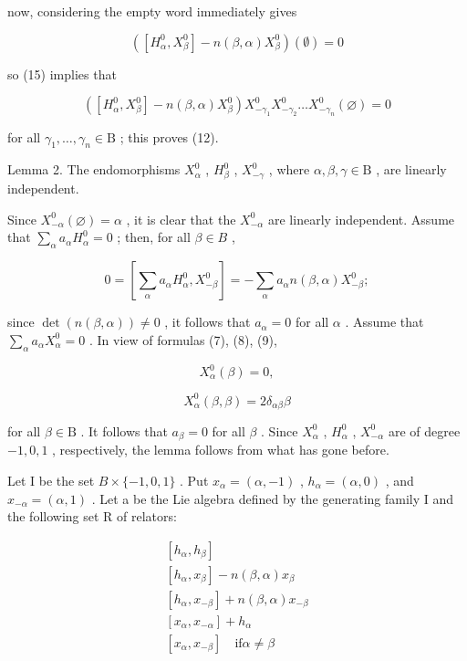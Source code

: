 now, considering the empty word immediately gives

\[
([ H _ {\alpha} ^ {0}, X _ {\beta} ^ {0} ] - n (\beta , \alpha) X _ {\beta} ^ {0}) (\emptyset) = 0
\]

so (15) implies that

\[
\left(\left[ H _ {\alpha} ^ {0}, X _ {\beta} ^ {0} \right] - n (\beta , \alpha) X _ {\beta} ^ {0}\right) X _ {- \gamma_ {1}} ^ {0} X _ {- \gamma_ {2}} ^ {0} \dots X _ {- \gamma_ {n}} ^ {0} (\varnothing) = 0
\]

for all \(\gamma_1, \ldots, \gamma_n \in \mathrm{B}\) ; this proves (12).

Lemma 2. The endomorphisms \(X_{\alpha}^{0}\) , \(H_{\beta}^{0}\) , \(X_{-\gamma}^{0}\) , where \(\alpha, \beta, \gamma \in \mathrm{B}\) , are linearly independent.

Since \(X_{-\alpha}^{0}(\varnothing) = \alpha\) , it is clear that the \(X_{-\alpha}^{0}\) are linearly independent. Assume that \(\sum_{\alpha} a_{\alpha} H_{\alpha}^{0} = 0\) ; then, for all \(\beta \in B\) ,

\[
0 = \left[ \sum_ {\alpha} a _ {\alpha} H _ {\alpha} ^ {0}, X _ {- \beta} ^ {0} \right] = - \sum_ {\alpha} a _ {\alpha} n (\beta , \alpha) X _ {- \beta} ^ {0};
\]

since \(\operatorname{det}(n(\beta, \alpha)) \neq 0\) , it follows that \(a_{\alpha} = 0\) for all \(\alpha\) . Assume that \(\sum_{\alpha} a_{\alpha} X_{\alpha}^{0} = 0\) . In view of formulas (7), (8), (9),

\[
X _ {\alpha} ^ {0} (\beta) = 0,
\]

\[
X _ {\alpha} ^ {0} (\beta , \beta) = 2 \delta_ {\alpha \beta} \beta
\]

for all \(\beta \in \mathrm{B}\) . It follows that \(a_{\beta} = 0\) for all \(\beta\) . Since \(X_{\alpha}^{0}\) , \(H_{\alpha}^{0}\) , \(X_{-\alpha}^{0}\) are of degree \(-1, 0, 1\) , respectively, the lemma follows from what has gone before.

Let I be the set \(B \times \{-1,0,1\}\) . Put \(x_{\alpha} = (\alpha, -1)\) , \(h_{\alpha} = (\alpha, 0)\) , and \(x_{-\alpha} = (\alpha, 1)\) . Let a be the Lie algebra defined by the generating family I and the following set R of relators:

\[
\begin{array}{l} \left[ h _ {\alpha}, h _ {\beta} \right] \\ \left[ h _ {\alpha}, x _ {\beta} \right] - n (\beta , \alpha) x _ {\beta} \\ \left[ h _ {\alpha}, x _ {- \beta} \right] + n (\beta , \alpha) x _ {- \beta} \\ \left[ x _ {\alpha}, x _ {- \alpha} \right] + h _ {\alpha} \\ \left[ x _ {\alpha}, x _ {- \beta} \right] \quad \text {if} \alpha \neq \beta \end{array}
\]

